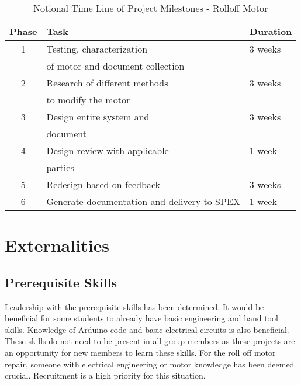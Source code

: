 \documentclass[conference]{IEEEtran} %
\begin{document}
\begin{table}[h!]
    \caption{Notional Time Line of Project Milestones - Rolloff Motor}
    \centering
    \begin{tabular}{@{}cll@{}}
    \toprule
    Phase & Task & Duration \\
    \midrule
    1 & Testing, characterization  & 3 weeks\\
    & of motor and document collection  \\
    2 & Research of different methods & 3 weeks \\ 
    & to modify the motor \\
    3 & Design entire system and  & 3 weeks \\
    & document\\
    4 & Design review with applicable & 1 week  \\
    & parties \\
    5 & Redesign based on feedback & 3 weeks \\
    6 & Generate documentation and delivery to SPEX & 1 week  \\
    \bottomrule
    \end{tabular}
\label{tab:rolloff}
\end{table}
\section{Externalities}
\subsection{Prerequisite Skills}
  Leadership with the prerequisite skills has been determined. It would be beneficial for some students to already have basic engineering and hand tool skills. Knowledge of Arduino code and basic electrical circuits is also beneficial. These skills do not need to be present in all group members as these projects are an opportunity for new members to learn these skills. For the roll off motor repair, someone with electrical engineering or motor  knowledge has been deemed crucial. Recruitment is a high priority for this situation. 
  
\end{document}
